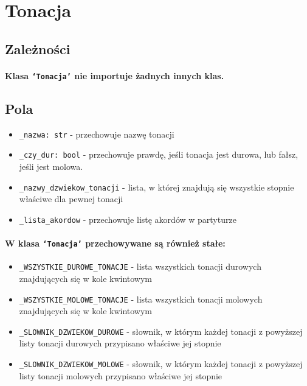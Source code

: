 \documentclass[dokumentacja.tex]{subfiles}
\begin{document}
\section{Tonacja}

\subsection{Zależności}
\paragraph*{Klasa \texttt{`Tonacja'} nie importuje żadnych innych klas.}

\subsection{Pola}
\begin{itemize}
    \item \texttt{\_nazwa: str} - przechowuje nazwę tonacji
    \item \texttt{\_czy\_dur: bool} - przechowuje prawdę, jeśli tonacja jest durowa, lub fałsz, jeśli jest molowa.
    \item \texttt{\_nazwy\_dzwiekow\_tonacji} - lista, w której znajdują się wszystkie stopnie właściwe dla pewnej tonacji
    \item \texttt{\_lista\_akordow} - przechowuje listę akordów w partyturze
\end{itemize}

\paragraph*{W klasa \texttt{`Tonacja'} przechowywane są również stałe:}
\begin{itemize}
    \item \texttt{\_WSZYSTKIE\_DUROWE\_TONACJE} - lista wszystkich tonacji durowych znajdujących się w kole kwintowym
    \item \texttt{\_WSZYSTKIE\_MOLOWE\_TONACJE} - lista wszystkich tonacji molowych znajdujących się w kole kwintowym
    \item \texttt{\_SLOWNIK\_DZWIEKOW\_DUROWE} - słownik, w którym każdej tonacji z powyższej listy tonacji durowych przypisano właściwe jej stopnie
    \item \texttt{\_SLOWNIK\_DZWIEKOW\_MOLOWE} - słownik, w którym każdej tonacji z powyższej listy tonacji molowych przypisano właściwe jej stopnie
\end{itemize}
\end{document}
